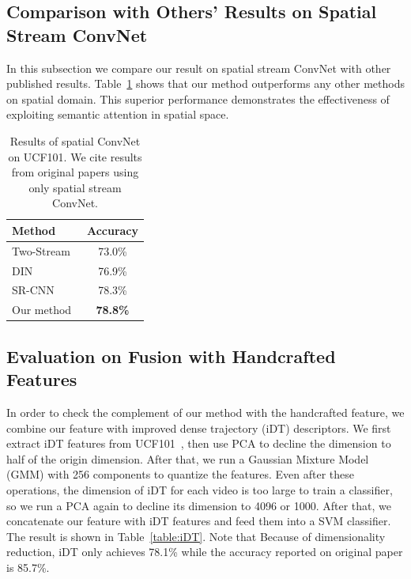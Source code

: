 \documentclass[10pt,twocolumn,letterpaper]{article}
\begin{document}
\subsection{Comparison with Others' Results on Spatial Stream ConvNet}
In this subsection we compare our result on spatial stream ConvNet with other published results. Table~\ref{table:compare_spatial} shows that our method outperforms any other methods on spatial domain. This superior performance demonstrates the effectiveness of exploiting semantic attention in spatial space.
\begin{table}
	\begin{center}
		\begin{tabular}{|l|c|}
			\hline
			Method 											& Accuracy	\\
			\hline
			Two-Stream~\cite{simonyan2014two}				& 73.0\% 	\\
			DIN~\cite{bilen2016dynamic}						& 76.9\% 	\\
			SR-CNN~\cite{wang2016two}						& 78.3\% 	\\
			Our method                  					& \textbf{78.8\%} \\
			\hline
		\end{tabular}
	\end{center}
	\caption{Results of spatial ConvNet on UCF101. We cite results from original papers using only spatial stream ConvNet.}
	\label{table:compare_spatial}
\end{table}
\subsection{Evaluation on Fusion with Handcrafted Features}
In order to check the complement of our method with the handcrafted feature, we combine our feature with improved dense trajectory (iDT) descriptors. We first extract iDT features from UCF101~\cite{soomro2012ucf101}, then use PCA to decline the dimension to half of the origin dimension. After that, we run a Gaussian Mixture Model (GMM) with 256 components to quantize the features. Even after these operations, the dimension of iDT for each video is too large to train a classifier, so we run a PCA again to decline its dimension to 4096 or 1000. After that, we concatenate our feature with iDT features and feed them into a SVM classifier. The result is shown in Table~\ref{table:iDT}. Note that Because of dimensionality reduction, iDT only achieves 78.1\% while the accuracy reported on original paper is 85.7\%.
\end{document}
